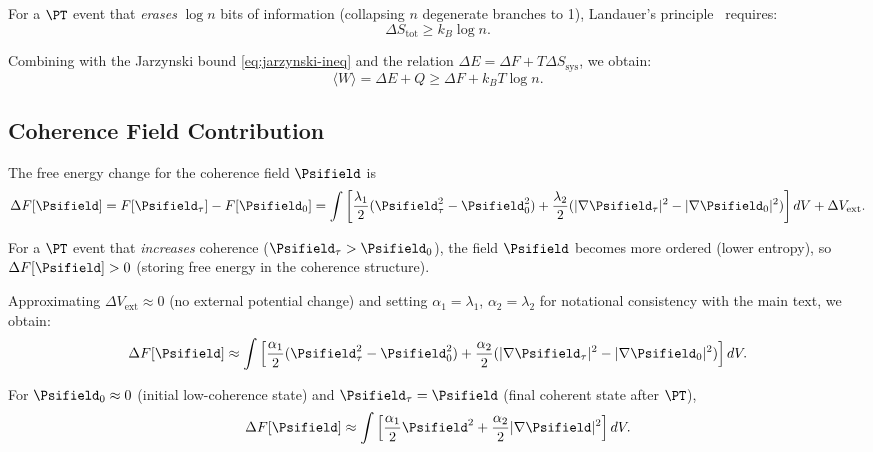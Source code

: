 For a \(\PT\) event that \emph{erases} \(\log n\) bits of information (collapsing \(n\) degenerate branches to 1), Landauer's principle~\cite{Landauer1961} requires:
\begin{equation}
\Delta S_{\mathrm{tot}} \ge k_B \log n.
\end{equation}

Combining with the Jarzynski bound \eqref{eq:jarzynski-ineq} and the relation \(\Delta E = \Delta F + T\Delta S_{\mathrm{sys}}\), we obtain:
\begin{equation}
\langle W \rangle = \Delta E + Q \ge \Delta F + k_B T \log n.
\end{equation}

\subsection{Coherence Field Contribution}

The free energy change for the coherence field \(\Psifield\) is
\begin{equation}
\Delta F[\Psifield] = F[\Psifield_\tau] - F[\Psifield_0] = \int \left[ \frac{\lambda_1}{2}(\Psifield_\tau^2 - \Psifield_0^2) + \frac{\lambda_2}{2}(|\nabla\Psifield_\tau|^2 - |\nabla\Psifield_0|^2) \right] dV + \Delta V_{\mathrm{ext}}.
\end{equation}

For a \(\PT\) event that \emph{increases} coherence (\(\Psifield_\tau > \Psifield_0\)), the field \(\Psifield\) becomes more ordered (lower entropy), so \(\Delta F[\Psifield]>0\) (storing free energy in the coherence structure).

Approximating \(\Delta V_{\mathrm{ext}}\approx 0\) (no external potential change) and setting \(\alpha_1=\lambda_1\), \(\alpha_2=\lambda_2\) for notational consistency with the main text, we obtain:
\begin{equation}
\Delta F[\Psifield] \approx \int \left[ \frac{\alpha_1}{2}(\Psifield_\tau^2 - \Psifield_0^2) + \frac{\alpha_2}{2}(|\nabla\Psifield_\tau|^2 - |\nabla\Psifield_0|^2) \right] dV.
\end{equation}

For \(\Psifield_0 \approx 0\) (initial low-coherence state) and \(\Psifield_\tau = \Psifield\) (final coherent state after \(\PT\)),
\begin{equation}
\Delta F[\Psifield] \approx \int \left[ \frac{\alpha_1}{2}\Psifield^2 + \frac{\alpha_2}{2}|\nabla\Psifield|^2 \right] dV.
\end{equation}

